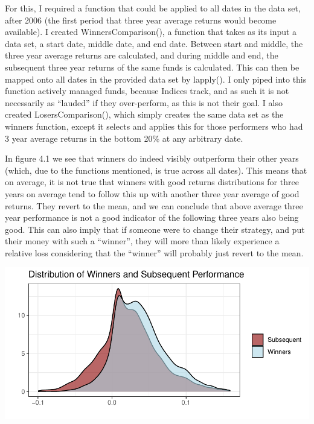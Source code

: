 \documentclass[11pt,preprint, authoryear]{elsarticle}
\let\origfigure\figure
\let\endorigfigure\endfigure
\renewenvironment{figure}[1][2] {
    \expandafter\origfigure\expandafter[H]
} {
    \endorigfigure
}
\numberwithin{equation}{section}
\numberwithin{figure}{section}
\numberwithin{table}{section}
\begin{document}
For this, I required a function that could be applied to all dates in
the data set, after 2006 (the first period that three year average
returns would become available). I created WinnersComparison(), a
function that takes as its input a data set, a start date, middle date,
and end date. Between start and middle, the three year average returns
are calculated, and during middle and end, the subsequent three year
returns of the same funds is calculated. This can then be mapped onto
all dates in the provided data set by lapply(). I only piped into this
function actively managed funds, because Indices track, and as such it
is not necessarily as ``lauded'' if they over-perform, as this is not
their goal. I also created LosersComparison(), which simply creates the
same data set as the winners function, except it selects and applies
this for those performers who had 3 year average returns in the bottom
20\% at any arbitrary date.

In figure 4.1 we see that winners do indeed visibly outperform their
other years (which, due to the functions mentioned, is true across all
dates). This means that on average, it is not true that winners with
good returns distributions for three years on average tend to follow
this up with another three year average of good returns. They revert to
the mean, and we can conclude that above average three year performance
is not a good indicator of the following three years also being good.
This can also imply that if someone were to change their strategy, and
put their money with such a ``winner'', they will more than likely
experience a relative loss considering that the ``winner'' will probably
just revert to the mean.

\begin{figure}[H]

{\centering \includegraphics{Question-4_files/figure-latex/unnamed-chunk-1-1} 

}

\caption{ \label{Figure4.1}}\label{fig:unnamed-chunk-1}
\end{figure}
\end{document}
